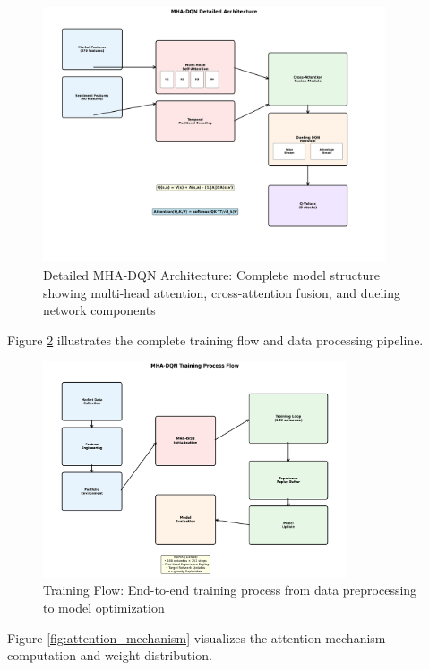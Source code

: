 \documentclass[11pt]{article}
\begin{document}
\begin{figure}[H]
\centering
\includegraphics[width=0.9\textwidth]{figures/detailed_architecture.png}
\caption{Detailed MHA-DQN Architecture: Complete model structure showing multi-head attention, cross-attention fusion, and dueling network components}
\label{fig:detailed_architecture}
\end{figure}

Figure \ref{fig:training_flow} illustrates the complete training flow and data processing pipeline.

\begin{figure}[H]
\centering
\includegraphics[width=0.8\textwidth]{figures/training_flow.png}
\caption{Training Flow: End-to-end training process from data preprocessing to model optimization}
\label{fig:training_flow}
\end{figure}

Figure \ref{fig:attention_mechanism} visualizes the attention mechanism computation and weight distribution.
\end{document}
